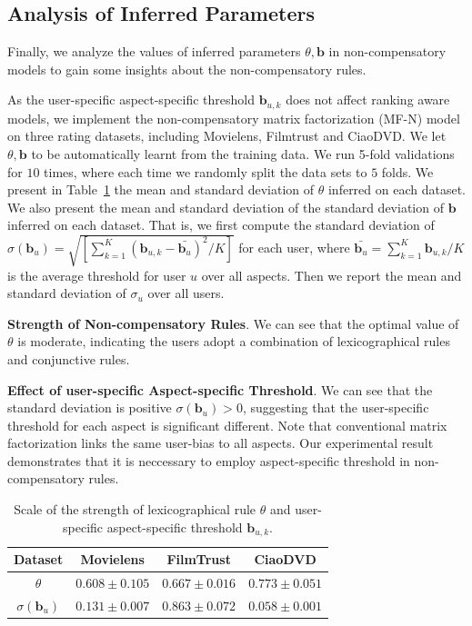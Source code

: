 \documentclass[letterpaper]{article} %
\begin{document}
\subsection{Analysis of Inferred Parameters}

Finally, we analyze the values of inferred parameters $\theta,\mathbf{b}$ in non-compensatory models to gain some insights about the non-compensatory rules. 

As the user-specific aspect-specific threshold $\mathbf{b}_{u,k}$ does not affect ranking aware models, we implement the non-compensatory matrix factorization (MF-N) model on three rating datasets, including Movielens, Filmtrust and CiaoDVD. We let $\theta,\mathbf{b}$ to be automatically learnt from the training data. We run 5-fold validations for $10$ times, where each time we randomly split the data sets to $5$ folds. We present in Table~\ref{tab:parameters} the mean and standard deviation of $\theta$ inferred on each dataset. We also present the mean and standard deviation of the standard deviation of $\mathbf{b}$ inferred on each dataset. That is, we first compute the standard deviation of $\sigma(\mathbf{b}_u)=\sqrt {[\sum_{k=1}^{K} (\mathbf{b}_{u,k}-\bar{\mathbf{b}_u})^2 /K]} $ for each user, where $\bar{\mathbf{b}_u}=\sum_{k=1}^K \mathbf{b}_{u,k} /K$ is the average threshold for user $u$ over all aspects. Then we report the mean and standard deviation of $\sigma_u$ over all users. 

\textbf{Strength of Non-compensatory Rules}. We can see that the optimal value of $\theta$ is moderate, indicating the users adopt a combination of lexicographical rules and conjunctive rules.  

\textbf{Effect of user-specific Aspect-specific Threshold}. We can see that the standard deviation is positive $\sigma(\mathbf{b}_{u})>0$, suggesting that the user-specific threshold for each aspect is significant different. Note that conventional matrix factorization links the same user-bias to all aspects. Our experimental result demonstrates that it is neccessary to employ aspect-specific threshold in non-compensatory rules. 
\begin{table}[htp]
\caption{Scale of the strength of lexicographical rule $\theta$ and user-specific aspect-specific threshold $\mathbf{b}_{u,k}$.}
\scriptsize
\begin{center}
\begin{tabular}{|c|c|c|c|}
\hline
Dataset & Movielens & FilmTrust & CiaoDVD \\\hline
$\theta$ & $0.608\pm 0.105$ & $0.667\pm 0.016$ &	$0.773\pm 0.051$\\\hline
$\sigma(\mathbf{b}_{u})$ & $0.131\pm 0.007$ &	$0.863\pm 0.072$	& $0.058\pm 0.001$  \\\hline
\end{tabular}
\end{center}
\label{tab:parameters}
\end{table}%
\end{document}
